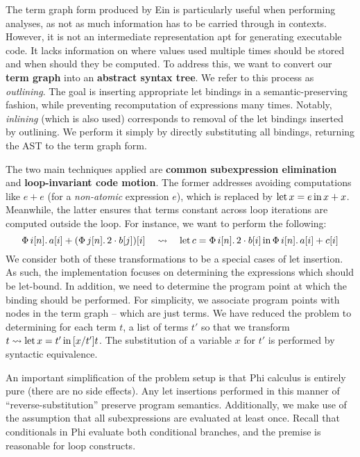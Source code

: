 The term graph form produced by Ein is particularly useful when performing analyses, as not as much information has to be carried through in contexts. However, it is not an intermediate representation apt for generating executable code. It lacks information on where values used multiple times should be stored and when should they be computed. To address this, we want to convert our \textbf{term graph} into an \textbf{abstract syntax tree}. We refer to this process as \textit{outlining}. The goal is inserting appropriate let bindings in a semantic-preserving fashion, while preventing recomputation of expressions many times. Notably, \textit{inlining} (which is also used) corresponds to removal of the let bindings inserted by outlining. We perform it simply by directly substituting all bindings, returning the AST to the term graph form.

The two main techniques applied are \textbf{common subexpression elimination} and \textbf{loop-invariant code motion}. The former addresses avoiding computations like $e + e$ (for a \textit{non-atomic} expression $e$), which is replaced by $\mathrm{let}\,{x}={e}\,\mathrm{in}\,{x + x}$. Meanwhile, the latter ensures that terms constant across loop iterations are computed outside the loop. For instance, we want to perform the following:
$$ 
\phivec{i}{n}{a[i] + \left( \phivec{j}{n}{2 \cdot b[j]} \right)[i]} \quad\leadsto\quad \philet{c}{\phivec{i}{n}{2 \cdot b[i]}}{\phivec{i}{n}{a[i] + c[i]}} 
$$
We consider both of these transformations to be a special cases of let insertion. As such, the implementation focuses on determining the expressions which should be let-bound. In addition, we need to determine the program point at which the binding should be performed. For simplicity, we associate program points with nodes in the term graph -- which are just terms. We have reduced the problem to determining for each term $t$, a list of terms $t'$ so that we transform $t \leadsto \mathrm{let}\,{x}={t'}\,\mathrm{in}\,{[x/t']t}$. The substitution of a variable $x$ for $t'$ is performed by syntactic equivalence.

An important simplification of the problem setup is that Phi calculus is entirely pure (there are no side effects). Any let insertions performed in this manner of ``reverse-substitution'' preserve program semantics. Additionally, we make use of the assumption that all subexpressions are evaluated at least once. Recall that conditionals in Phi evaluate both conditional branches, and the premise is reasonable for loop constructs.

